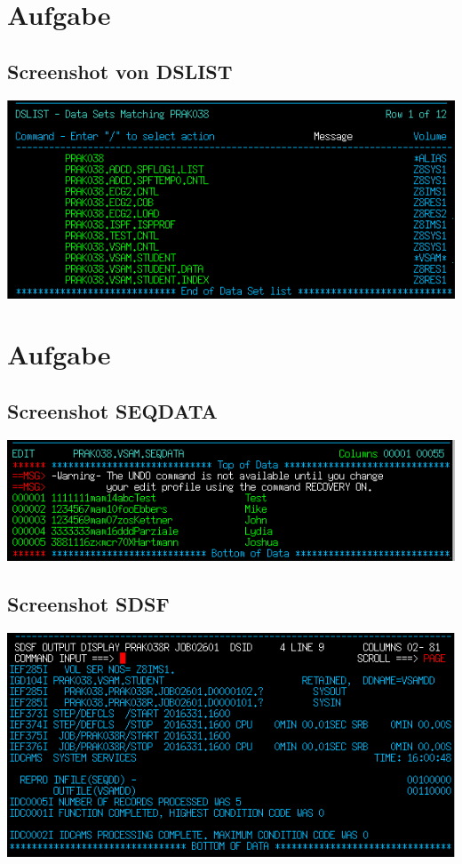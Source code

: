 \documentclass[a4paper]{scrartcl}
\begin{document}
	\section{Aufgabe}
	\subsection{Screenshot von DSLIST}
	\includegraphics{screenshots/1_DSLIST.png}
	\section{Aufgabe}
	\subsection{Screenshot SEQDATA}
	\includegraphics{screenshots/2_SEQDATA.png}
	
	\subsection{Screenshot SDSF}
	\includegraphics{screenshots/2_SDSF.png}
		
\end{document}
